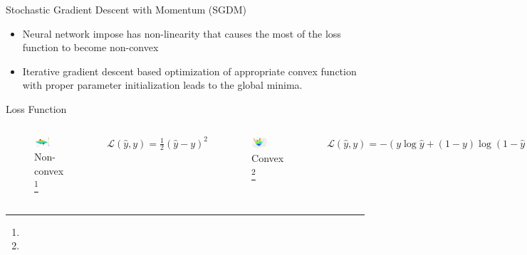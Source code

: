 \documentclass[10pt]{beamer}
\begin{document}
\begin{frame}{Stochastic Gradient Descent with Momentum (SGDM)}
   \begin{itemize}
       \item Neural network impose has non-linearity that causes the most of the loss function to become non-convex
       \item Iterative gradient descent based optimization of appropriate convex function with proper parameter initialization leads to the global minima. 
   \end{itemize}
   
\begin{block}{Loss Function}
     \begin{columns}
            \begin{figure}
                \centering
                \includegraphics[width=0.5\textwidth]{Images/nonconvex.png}
                \caption{Non-convex \footnote[frame]{}}
            \end{figure}
            \vspace{-5pt}
            \centering
            $\mathcal{L}(\hat{y}, y)=\frac{1}{2}(\hat{y}-y)^{2}$
            
            \begin{figure}
                \centering
                \includegraphics[width=0.5\textwidth]{Images/convex.png}
                \caption{Convex \footnote[frame]{}}
            \end{figure}    
            \vspace{-5pt}
            \centering
            $\mathcal{L}(\hat{y}, y)=-(y \log \hat{y}+(1-y) \log (1-\hat{y}))$
     \end{columns}
\end{block}
\end{frame}
\end{document}
